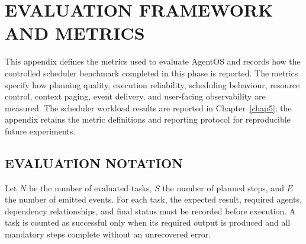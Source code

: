 \chapter{\uppercase{Evaluation Framework and Metrics}}
\label{app:metrics}

This appendix defines the metrics used to evaluate AgentOS and records how the
controlled scheduler benchmark completed in this phase is reported. The metrics specify
how planning quality, execution reliability, scheduling behaviour, resource
control, context paging, event delivery, and user-facing observability are
measured. The scheduler workload results are reported in Chapter~\ref{chap5};
the appendix retains the metric definitions and reporting protocol for
reproducible future experiments.

\section{\uppercase{Evaluation Notation}}
Let $N$ be the number of evaluated tasks, $S$ the number of planned steps, and $E$ the number of emitted events. For each task, the expected result, required agents, dependency relationships, and final status must be recorded before execution. A task is counted as successful only when its required output is produced and all mandatory steps complete without an unrecovered error.

